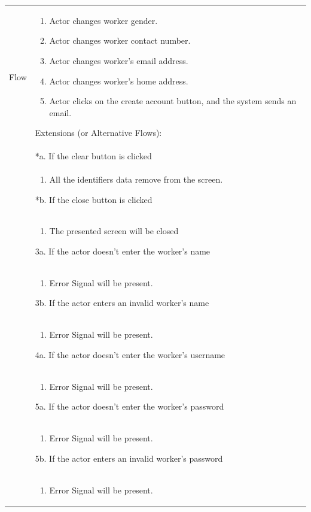 \documentclass[12pt,a4paper]{report}
\begin{document}
\begin{tabular}{ | m{3cm} | m{12cm}| } \hline
Flow &
\begin{enumerate}
\item Actor changes worker gender. 
\item Actor changes worker contact number. 
\item Actor changes worker's email address.
\item Actor changes worker's home address. 
\item Actor clicks on the create account button, and the system sends an email.
\end{enumerate}
Extensions (or Alternative Flows):\\
& *a. If the clear button is clicked \\
& \begin{enumerate}
		\item All the identifiers data remove from the screen.
	\end{enumerate}
*b. If the close button is clicked\\
&	\begin{enumerate}
		\item The presented screen will be closed
	\end{enumerate}
3a. If the actor doesn't enter the worker's name \\ 	
&	\begin{enumerate}
		\item Error Signal will be present.
	\end{enumerate}
3b. If the actor enters an invalid worker's name \\ 	
&	\begin{enumerate}
		\item Error Signal will be present.
	\end{enumerate}
4a. If the actor doesn't enter the worker's username\\ 	
&	\begin{enumerate}
		\item Error Signal will be present.
	\end{enumerate}
5a. If the actor doesn't enter the worker's password \\ 	
&	\begin{enumerate}
		\item Error Signal will be present.
	\end{enumerate}
5b. If the actor enters an invalid worker's password \\ 	
&	\begin{enumerate}
		\item Error Signal will be present.
	\end{enumerate}
\\ \hline
\end{tabular}
\end{document}
